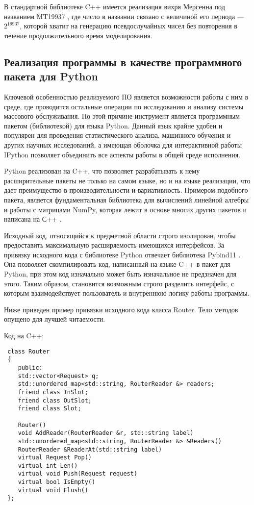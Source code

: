  В стандартной библиотеке C++ имеется реализация вихря Мерсенна под названием MT19937 \cite{mersenn}, где число в названии связано с величиной его периода --- $2^19937$, которой хватит на генерацию псевдослучайных чисел без повторения в течение продолжительного время моделирования.
 \subsection{Реализация программы в качестве программного пакета для Python}
 Ключевой особенностью реализуемого ПО является возможности работы с ним в среде, где проводится остальные операции по исследованию и анализу системы массового обслуживания. По этой причине инструмент является программным пакетом (библиотекой) для языка Python. Данный язык крайне удобен и популярен для проведения статистического анализа, машинного обучения и других научных исследований, а имеющая оболочка для интерактивной работы IPython позволяет объединить все аспекты работы в общей среде исполнения.
 
 Python реализован на C++, что позволяет разрабатывать к нему расширительные пакеты не только на самом языке, но и на языке реализации, что дает преимущество в производительности и вариативность. Примером подобного пакета, является фундаментальная библиотека для вычислений линейной алгебры и работы с матрицами NumPy, которая лежит в основе многих других пакетов и написана на С++ \cite{numpy}.
 
 Исходный код, относящийся к предметной области строго изолирован, чтобы предоставить максимальную расширяемость имеющихся интерфейсов. За привязку исходного кода с библиотеке Python отвечает библиотека Pybind11 \cite{pybind}. Она позволяет скомпилировать код, написанный на языке C++ в пакет для Python, при этом код изначально может быть изначальное не предзначен для этого. Таким образом, становится возможным строго разделить интерфейс, с которым взаимодействует пользователь и внутреннюю логику работы программы.
 
 Ниже приведен пример привязки исходного кода класса Router. Тело методов опущено для лучшей читаемости.
 
 Код на C++:
 \begin{lstlisting}
 class Router
 {
 	public:
 	std::vector<Request> q;
 	std::unordered_map<std::string, RouterReader &> readers;
 	friend class InSlot;
 	friend class OutSlot;
 	friend class Slot;
 	
 	Router()
 	void AddReader(RouterReader &r, std::string label)
 	std::unordered_map<std::string, RouterReader &> &Readers()
 	RouterReader &ReaderAt(std::string label)
 	virtual Request Pop()
 	virtual int Len()
 	virtual void Push(Request request)
 	virtual bool IsEmpty()	
 	virtual void Flush()
 };
 \end{lstlisting}

